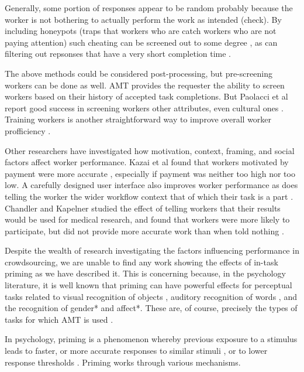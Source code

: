 \documentclass[a4paper]{report}
\begin{document}
Generally, some portion of responses appear to be random probably because
the worker is not bothering to actually perform the work as intended
\cite{lease2011quality}(check).  By including honeypots (traps that workers who are
catch workers who are not paying attention) such cheating can be screened out 
to some degree \cite{snow2008cheap}, as can filtering out repsonses
that have a very short completion time \cite{kazai2013analysis}.

The above methods could be considered post-processing, but pre-screening 
workers can be done as well. AMT provides the requester the ability to screen
workers based on their history of accepted task completions. But Paolacci et al
report good success in screening workers other attributes, even cultural ones
\cite{paolacci2010running}.  Training workers is another straightforward way 
to improve overall worker profficiency \cite{le2010ensuring}. 

Other researchers have investigated how motivation, context, framing, and 
social factors affect worker performance.  Kazai et al found that workers 
motivated by payment were more accurate \cite{kazai2013analysis}, especially
if payment was neither too high nor too low.
A carefully designed user interface also improves worker performance 
\cite{Finnerty2013} as does telling the worker the wider workflow context that
of which their task is a part \cite{Kinnaird2012281}. Chandler and Kapelner
studied the effect of telling workers that their results would be used for
medical research, and found that workers were more likely to participate, but
did not provide more accurate work than when told nothing 
\cite{chandler2013breaking}.

Despite the wealth of research investigating the factors influencing 
performance in crowdsourcing, we are unable to find any work showing the 
effects of in-task priming as we have described it.  This is concerning 
because, in the psychology literature, it is well known that priming can have 
powerful effects for perceptual tasks related to visual 
recognition of objects \cite{BJOP:BJOP1796}, auditory recognition of words 
\cite{BJOP:BJOP1826}, and the recognition
of gender* and affect*.  These are, of course, precisely the types of tasks 
for which AMT is used \cite{yuen2011survey, snow2008cheap}.


In psychology, priming is a phenomenon whereby previous exposure to a 
stimulus leads to faster, or more accurate responses to similar stimuli 
\cite{Ghuman17062008}, or to lower response thresholds \cite{BJOP:BJOP1826}.
Priming works through various mechanisms.  
\end{document}
